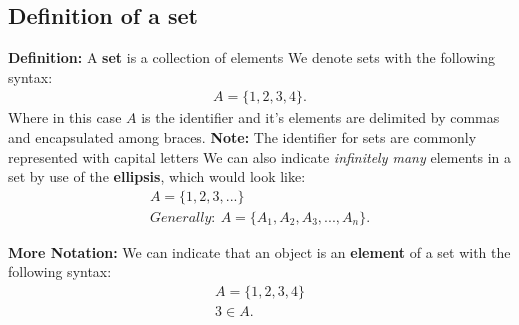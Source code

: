 \documentclass{report}
\begin{document}
    \subsection{Definition of a set} 
    \bigbreak \noindent 
    \begin{mdframed}
        \textbf{Definition:} A \textbf{set} is a collection of elements 
        \smallbreak \noindent
        We denote sets with the following syntax:
        \begin{align*}
            A  = \{1,2,3,4\}
        .\end{align*}
        Where in this case $A$ is the identifier and it's elements are delimited by commas and encapsulated among braces.
        \smallbreak \noindent
        \textbf{Note:} The identifier for sets are commonly represented with capital letters
        \bigbreak \noindent 
        We can also indicate \textit{infinitely many} elements in a set by use of the \textbf{ellipsis}, which would look like:
        \begin{align*}
            A = \{1,2,3,...\} \\
            Generally:\ A=\{A_{1}, A_{2}, A_{3},...,A_{n}\}
        .\end{align*}
    \end{mdframed}
    \bigbreak \noindent 
    \textbf{More Notation:}
    We can indicate that an object is an \textbf{element} of a set with the following syntax:
    \begin{align*}
        A = \{1,2,3,4\} \\
        3 \in A
    .\end{align*}
    \bigbreak \noindent 
\end{document}
